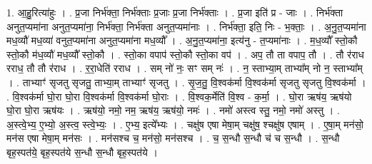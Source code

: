\documentclass[17pt]{extarticle}
\begin{document}
1. आ॒हु॒रित्या॑हुः । . प्र॒जा निर्भ॑क्ता॒ निर्भ॑क्ताः प्र॒जाः प्र॒जा निर्भ॑क्ताः । . प्र॒जा इति॑ प्र - जाः । . निर्भ॑क्ता अनुत॒प्यमा॑ना अनुत॒प्यमा॑ना॒ निर्भ॑क्ता॒ निर्भ॑क्ता अनुत॒प्यमा॑नाः । . निर्भ॑क्ता॒ इति॒ निः - भ॒क्ताः॒ । . अ॒नु॒त॒प्यमा॑ना मध॒व्यौ॑ मध॒व्या॑ वनुत॒प्यमा॑ना अनुत॒प्यमा॑ना मध॒व्यौ᳚ । . अ॒नु॒त॒प्यमा॑ना॒ इत्य॑नु - त॒प्यमा॑नाः । . म॒ध॒व्यौ᳚ स्तो॒कौ स्तो॒कौ म॑ध॒व्यौ॑ मध॒व्यौ᳚ स्तो॒कौ । . स्तो॒का वपाप॑ स्तो॒कौ स्तो॒का वप॑ । . अप॒ तौ ता वपाप॒ तौ । . तौ र॑राध रराध॒ तौ तौ र॑राध । . र॒रा॒धेति॑ रराध । . सम् नो॑ नः॒ सꣳ सम् नः॑ । . न॒ स्ताभ्या॒म् ताभ्या᳚म् नो न॒ स्ताभ्या᳚म् । . ताभ्याꣳ॑ सृजतु सृजतु॒ ताभ्या॒म् ताभ्याꣳ॑ सृजतु । . सृ॒ज॒तु॒ वि॒श्वक॑र्मा वि॒श्वक॑र्मा सृजतु सृजतु वि॒श्वक॑र्मा । . वि॒श्वक॑र्मा घो॒रा घो॒रा वि॒श्वक॑र्मा वि॒श्वक॑र्मा घो॒राः । . वि॒श्वक॒र्मेति॑ वि॒श्व - क॒र्मा॒ । . घो॒रा ऋष॑य॒ ऋष॑यो घो॒रा घो॒रा ऋष॑यः । . ऋष॑यो॒ नमो॒ नम॒ ऋष॑य॒ ऋष॑यो॒ नमः॑ । . नमो॑ अस्त्व स्तु॒ नमो॒ नमो॑ अस्तु । . अ॒स्त्वे॒भ्य॒ ए॒भ्यो॒ अ॒स्त्व॒ स्त्वे॒भ्यः॒ । . ए॒भ्य॒ इत्ये᳚भ्यः । . चक्षु॑ष एषा मेषा॒म् चक्षु॑ष॒ श्चक्षु॑ष एषाम् । . ए॒षा॒म् मन॑सो॒ मन॑स एषा मेषा॒म् मन॑सः । . मन॑सश्च च॒ मन॑सो॒ मन॑सश्च । . च॒ स॒न्धौ स॒न्धौ च॑ च स॒न्धौ । . स॒न्धौ बृह॒स्पत॑ये॒ बृह॒स्पत॑ये स॒न्धौ स॒न्धौ बृह॒स्पत॑ये । \newline
\end{document}
